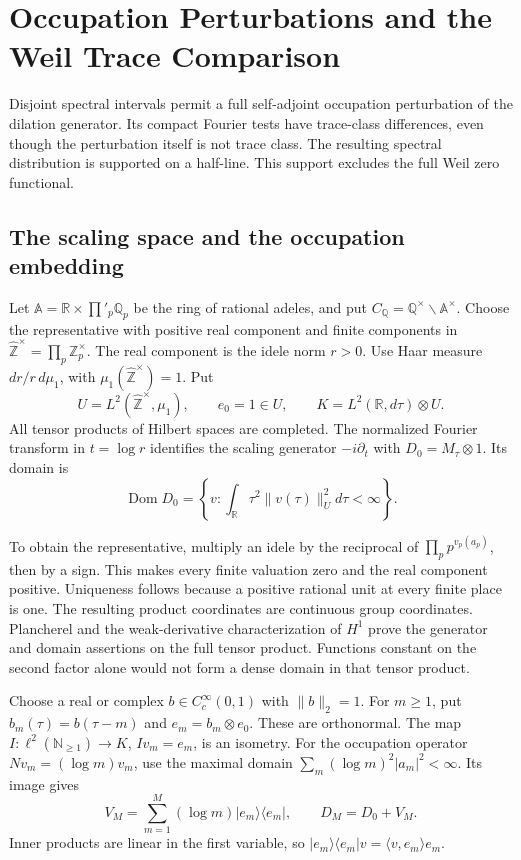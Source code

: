 \chapter{Occupation Perturbations and the Weil Trace Comparison}
\label{v4-arith:w7-j:ATP-adelic-scattering}

Disjoint spectral intervals permit a full self-adjoint occupation
perturbation of the dilation generator. Its compact Fourier tests
have trace-class differences, even though the perturbation itself
is not trace class. The resulting spectral distribution is supported
on a half-line. This support excludes the full Weil zero functional.

\section{The scaling space and the occupation embedding}

\begin{definition}
\label{v4-arith:w7-j:def:H-idele}
Let $\mathbb A=\mathbb R\times\prod'_p\mathbb Q_p$ be the ring
of rational adeles, and put
$C_{\mathbb Q}=\mathbb Q^\times\backslash\mathbb A^\times$.
Choose the representative with positive real component and finite
components in $\widehat{\mathbb Z}^{\times}=\prod_p\mathbb Z_p^\times$.
The real component is the idele norm $r>0$. Use Haar measure
$dr/r\,d\mu_1$, with $\mu_1(\widehat{\mathbb Z}^{\times})=1$.
Put
\[
 U=L^2(\widehat{\mathbb Z}^{\times},\mu_1),\qquad e_0=1\in U,
 \qquad K=L^2(\mathbb R,d\tau)\otimes U.
\]
All tensor products of Hilbert spaces are completed.
The normalized Fourier transform in $t=\log r$ identifies the
scaling generator $-i\partial_t$ with $D_0=M_\tau\otimes1$.
Its domain is
\[
 \operatorname{Dom}D_0=
 \left\{v:\int_{\mathbb R}\tau^2\|v(\tau)\|_U^2d\tau<\infty\right\}.
\]
\end{definition}

To obtain the representative, multiply an idele by the reciprocal
of $\prod_pp^{v_p(a_p)}$, then by a sign. This makes every finite
valuation zero and the real component positive. Uniqueness follows
because a positive rational unit at every finite place is one.
The resulting product coordinates are continuous group coordinates.
Plancherel and the weak-derivative characterization of $H^1$
prove the generator and domain assertions on the full tensor product.
Functions constant on the second factor alone would not form a dense
domain in that tensor product.

Choose a real or complex $b\in C_c^\infty(0,1)$ with $\|b\|_2=1$.
For $m\ge1$, put $b_m(\tau)=b(\tau-m)$ and
$e_m=b_m\otimes e_0$. These are orthonormal. The map
$I:\ell^2(\mathbb N_{\ge1})\to K$, $Iv_m=e_m$, is an isometry.
For the occupation operator $Nv_m=(\log m)v_m$, use the maximal
domain $\sum_m(\log m)^2|a_m|^2<\infty$.
Its image gives
\[
 V_M=\sum_{m=1}^M(\log m)|e_m\rangle\langle e_m|,
 \qquad D_M=D_0+V_M.
\]
Inner products are linear in the first variable, so
$|e_m\rangle\langle e_m|v=\langle v,e_m\rangle e_m$.

